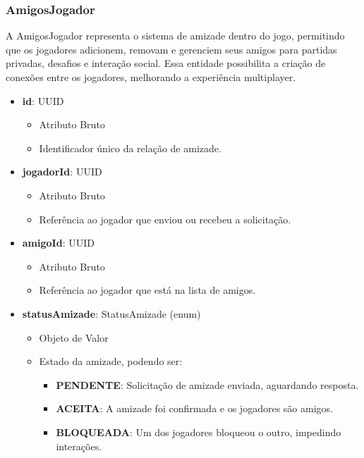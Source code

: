     
    \subsubsection{AmigosJogador}
    A AmigosJogador representa o sistema de amizade dentro do jogo, permitindo que os jogadores adicionem, removam e gerenciem seus amigos para partidas privadas, desafios e interação social. Essa entidade possibilita a criação de conexões entre os jogadores, melhorando a experiência multiplayer.
    \begin{itemize}
        \item \textbf{id}: UUID  
              \begin{itemize}
                  \item Atributo Bruto
                  \item Identificador único da relação de amizade.
              \end{itemize}
    
        \item \textbf{jogadorId}: UUID  
              \begin{itemize}
                  \item Atributo Bruto
                  \item Referência ao jogador que enviou ou recebeu a solicitação.
              \end{itemize}
    
        \item \textbf{amigoId}: UUID  
              \begin{itemize}
                  \item Atributo Bruto
                  \item Referência ao jogador que está na lista de amigos.
              \end{itemize}
    
        \item \textbf{statusAmizade}: StatusAmizade (enum)  
              \begin{itemize}
                  \item Objeto de Valor
                  \item Estado da amizade, podendo ser:
                  \begin{itemize}
                      \item \textbf{PENDENTE}: Solicitação de amizade enviada, aguardando resposta.
                      \item \textbf{ACEITA}: A amizade foi confirmada e os jogadores são amigos.
                      \item \textbf{BLOQUEADA}: Um dos jogadores bloqueou o outro, impedindo interações.
                  \end{itemize}
              \end{itemize}
    

\end{itemize}
